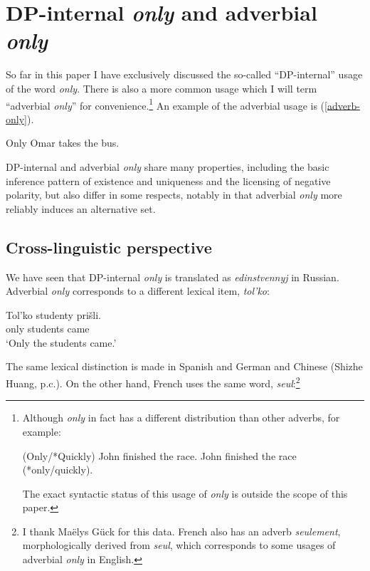 \section{DP-internal \textit{only} and adverbial \textit{only} \label{sec:two-onlys}}
So far in this paper I have exclusively discussed the so-called ``DP-internal'' usage of the word \textit{only}. There is also a more common usage which I will term ``adverbial \textit{only}'' for convenience.\footnote{Although \textit{only} in fact has a different distribution than other adverbs, for example: \begin{exe} \ex (Only/*Quickly) John finished the race. \ex John finished the race (*only/quickly). \end{exe} The exact syntactic status of this usage of \textit{only} is outside the scope of this paper.} An example of the adverbial usage is (\ref{adverb-only}).

\begin{exe}
	\ex \label{adverb-only} Only Omar takes the bus.
\end{exe}

DP-internal and adverbial \textit{only} share many properties, including the basic inference pattern of existence and uniqueness and the licensing of negative polarity, but also differ in some respects, notably in that adverbial \textit{only} more reliably induces an alternative set.

\subsection{Cross-linguistic perspective}
We have seen that DP-internal \textit{only} is translated as \textit{edinstvennyj} in Russian. Adverbial \textit{only} corresponds to a different lexical item, \textit{tol'ko}:

\begin{exe}
	\ex \gll Tol'ko studenty pri\v{s}li.\\
	only students came\\
	\glt `Only the students came.'
\end{exe}

The same lexical distinction is made in Spanish and German \citep{mcnally08} and Chinese (Shizhe Huang, p.c.). On the other hand, French uses the same word, \textit{seul}:\footnote{I thank Ma\"{e}lys G\"{u}ck for this data. French also has an adverb \textit{seulement}, morphologically derived from \textit{seul}, which corresponds to some usages of adverbial \textit{only} in English.}

